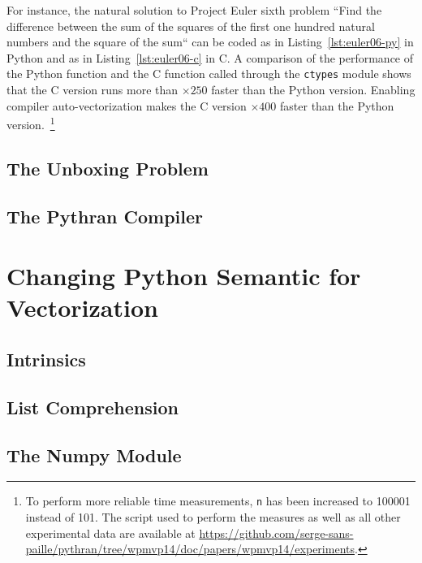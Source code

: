 \documentclass[preprint]{sigplanconf}
\begin{document}
For instance, the natural solution to Project Euler sixth problem ``Find the
difference between the sum of the squares of the first one hundred natural
numbers and the square of the sum`` can be coded as in
Listing~\ref{lst:euler06-py} in Python and as in Listing~\ref{lst:euler06-c} in
C. A comparison of the performance of the Python function and the C function
called through the \texttt{ctypes} module shows that the C version runs more
than $\times250$ faster than the Python version. Enabling compiler
auto-vectorization makes the C version $\times400$ faster than the Python
version.~\footnote{To perform more reliable time measurements, \texttt{n} has
    been increased to 100001 instead of 101. The script used to perform the
    measures as well as all other experimental data are available at
\url{https://github.com/serge-sans-paille/pythran/tree/wpmvp14/doc/papers/wpmvp14/experiments}.}





\subsection{The Unboxing Problem}

\subsection{The Pythran Compiler}

\section{Changing Python Semantic for Vectorization}

\subsection{Intrinsics}

\subsection{List Comprehension}

\subsection{The Numpy Module}
\end{document}
